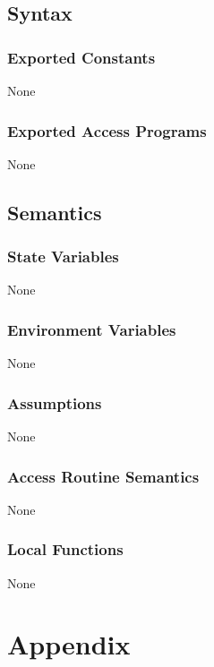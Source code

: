 \documentclass[12pt, titlepage]{article}
\begin{document}
\subsection{Syntax}

\subsubsection{Exported Constants}

None

\subsubsection{Exported Access Programs}

None

\subsection{Semantics}

\subsubsection{State Variables}

None

\subsubsection{Environment Variables}

None

\subsubsection{Assumptions}

None

\subsubsection{Access Routine Semantics}

None

\subsubsection{Local Functions}

None


  

\section{Appendix} \label{Appendix}
\end{document}

